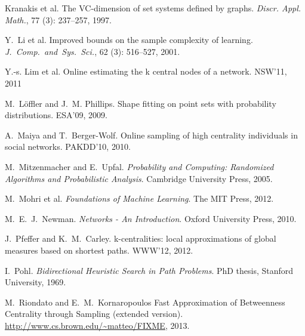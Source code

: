 \begin{thebibliography}{33}
Kranakis et al.
\newblock The {VC}-dimension of set systems defined by graphs.
\newblock \emph{Discr. Appl. Math.}, 77 (3):
  237--257, 1997.

Y.~Li et al.
\newblock Improved bounds on the sample complexity of learning.
\newblock \emph{J.~Comp.~and~Sys.~Sci.}, 62
  (3): 516--527, 2001.

Y.-s. Lim et al.
\newblock Online estimating the k central nodes of a network.
\newblock NSW'11, 2011

M.~L\"{o}ffler and J.~M. Phillips.
\newblock Shape fitting on point sets with probability distributions.
\newblock ESA'09, 2009.

A.~Maiya and T.~Berger-Wolf.
\newblock Online sampling of high centrality individuals in social networks.
\newblock PAKDD'10, 2010.

M.~Mitzenmacher and E.~Upfal.
\newblock \emph{Probability and Computing: Randomized Algorithms and
  Probabilistic Analysis}.
\newblock Cambridge University Press, 2005.

M.~Mohri et al.
\newblock \emph{Foundations of Machine Learning}.
\newblock The MIT Press, 2012.

M.~E.~J.~Newman.
\newblock \emph{Networks - An Introduction}.
\newblock Oxford University Press, 2010.

J.~Pfeffer and K.~M.~Carley.
\newblock k-centralities: local approximations of global measures based on
  shortest paths.
\newblock WWW'12, 2012.

I.~Pohl.
\newblock \emph{Bidirectional Heuristic Search in Path Problems}.
\newblock PhD thesis, Stanford University, 1969.

 M.~Riondato and E.~M.~Kornaropoulos
 \newblock Fast Approximation of Betweenness Centrality through Sampling
 (extended version).
 \newblock \url{http://www.cs.brown.edu/~matteo/FIXME}, 2013.


\end{thebibliography}
